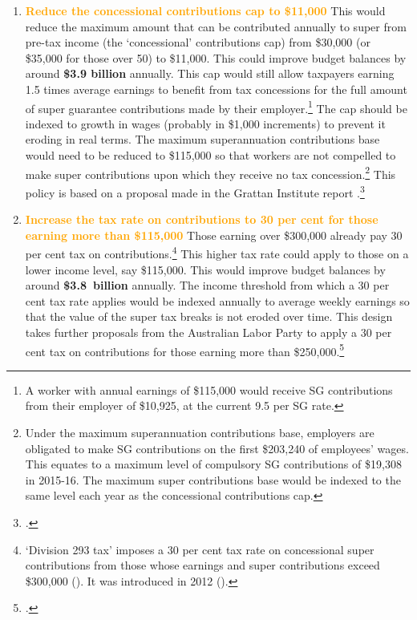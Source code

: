 \DEVIATION{}
\begin{enumerate}
\item 
\textcolor{Orange}{\textbf{Reduce the concessional contributions cap to \$11,000}} \hspace{0.5em plus 0.5em}
This would reduce the maximum amount that can be contributed annually to super from pre-tax income (the ‘concessional’ contributions cap) from \$30,000 (or \$35,000 for those over 50) to \$11,000. This could improve budget balances by around \textbf{\$3.9 billion} annually. This cap would still allow taxpayers earning 1.5 times average earnings to benefit from tax concessions for the full amount of super guarantee contributions made by their employer.\footnote{A worker with annual earnings of \$115,000 would receive SG contributions from their employer of \$10,925, at the current 9.5 per SG rate.}  The cap should be indexed to growth in wages (probably in \$1,000 increments) to prevent it eroding in real terms. The maximum superannuation contributions base would need to be reduced to \$115,000 so that workers are not compelled to make super contributions upon which they receive no tax concession.\footnote{Under the maximum superannuation contributions base, employers are obligated to make SG contributions on the first \$203,240 of employees’ wages. This equates to a maximum level of compulsory SG contributions of \$19,308 in 2015-16. The maximum super contributions base would be indexed to the same level each year as the concessional contributions cap.}  This policy is based on a proposal made in the Grattan Institute report .\footcite[][32]{DaleyMcGannonSavageEtAl2013BalancingBudgets} 

\item 
\textcolor{Orange}{\textbf{Increase the tax rate on contributions to 30 per cent for those earning more than \$115,000}} \hspace{0.5em plus 0.5em}
Those earning over \$300,000 already pay 30 per cent tax on contributions.\footnote{‘Division 293 tax’ imposes a 30 per cent tax rate on concessional super contributions from those whose earnings and super contributions exceed \$300,000 (\textcite{ATO2015HowisDiv293calculated}). It was introduced in 2012 (\textcite{Shorten2012}).}  This higher tax rate could apply to those on a lower income level, say \$115,000. This would improve budget balances by around \textbf{\$3.8~billion} annually.%
 The income threshold from which a 30 per cent tax rate applies would be indexed annually to average weekly earnings so that the value of the super tax breaks is not eroded over time. This design takes further proposals from the Australian Labor Party to apply a 30 per cent tax on contributions for those earning more than \$250,000.\footcite{ALP2015FairerSuper}  


\end{enumerate}

